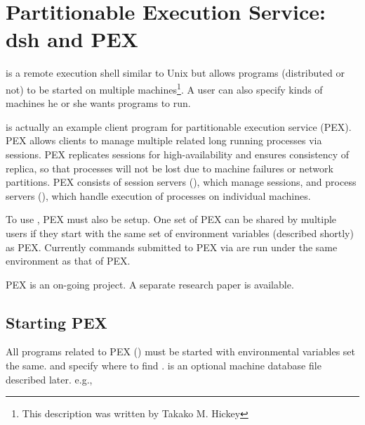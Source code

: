 %
%
%
\section{Partitionable Execution Service: dsh and PEX}

 is a remote execution shell similar to Unix
 but
allows programs (distributed or not) to be started on multiple
machines\footnote{This description was written by Takako M. Hickey}.
A user can also specify kinds of machines he or she wants
programs to run.
 
 is actually an example client program for partitionable
execution service (PEX).  PEX allows clients to manage
multiple related long running processes via sessions.
PEX replicates sessions for high-availability
and ensures consistency of replica, so that processes will not be
lost due to machine failures or network partitions.
PEX consists of session servers (), which manage sessions,
and process servers (), which handle execution of
processes on individual machines.
 
To use , PEX must also be setup.
One set of PEX can be shared by multiple users if they start
 with the same set of environment variables (described
shortly) as PEX.
Currently commands submitted to PEX via 
are run under the same environment as that of PEX.
 
PEX is an on-going project.  A separate research paper is available.


\subsection{Starting PEX}

All programs related to PEX () must be started with environmental variables
set the same.
 and 
specify where to find .
 is an optional machine database file described
later.  e.g.,

